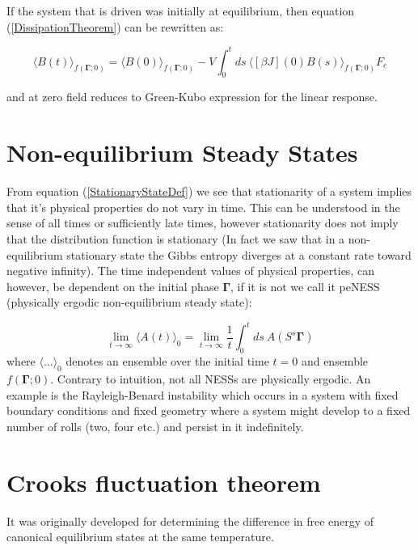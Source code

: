 \documentclass[a4paper,12pt,nofootinbib]{article}
\begin{document}
If the system that is driven was initially at equilibrium, then equation (\ref{DissipationTheorem}) can be rewritten as:

\begin{equation}
  \langle B(t) \rangle_{f(\bm{\Gamma};0)}=\langle B(0) \rangle_{f(\bm{\Gamma};0)} - V \int_0^t ds\ \langle[\beta J](0)B(s)\rangle_{f(\bm{\Gamma};0)} F_e
\end{equation}

and at zero field reduces to Green-Kubo expression for the linear response.


\section{Non-equilibrium Steady States}

From equation (\ref{StationaryStateDef}) we see that stationarity of a system implies that it's physical properties do not vary in time. This can be understood in the sense of all times or sufficiently late times, however stationarity does not imply that the distribution function is stationary (In fact we saw that in a non-equilibrium stationary state the Gibbs entropy diverges at a constant rate toward negative infinity).
The time independent values of physical properties, can however, be dependent on the initial phase $\bm{\Gamma}$, if it is not we call it peNESS (physically ergodic non-equilibrium steady state):

\begin{equation}
      \lim_{t \to \infty} \langle A(t) \rangle_0 = \lim_{t \to \infty} \frac{1}{t} \int_0^t ds\ A(S^s \bm{\Gamma})
\end{equation}
 where $\langle ... \rangle_0$ denotes an ensemble over the initial time $t=0$ and ensemble $f(\bm{\Gamma};0)$.
Contrary to intuition, not all NESSs are physically ergodic. An example is the Rayleigh-Benard instability which occurs in a system with fixed boundary conditions and fixed geometry where a system might develop to a fixed number of rolls (two, four etc.) and persist in it indefinitely.
\section{Crooks fluctuation theorem}

It was originally developed for determining the difference in free energy of canonical equilibrium states at the same temperature. 
\end{document}
